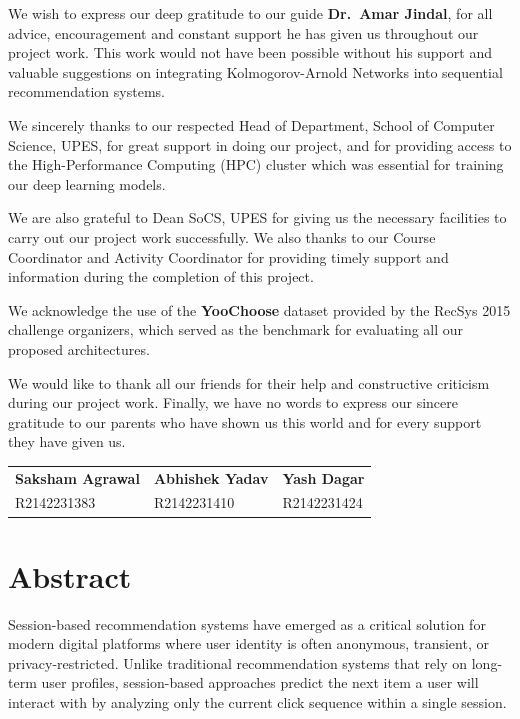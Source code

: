 \documentclass[12pt,a4paper]{report}
\begin{document}
We wish to express our deep gratitude to our guide \textbf{Dr.\ Amar Jindal},
for all advice, encouragement and constant support he has given us throughout our
project work. This work would not have been possible without his support and
valuable suggestions on integrating Kolmogorov-Arnold Networks into sequential
recommendation systems.

We sincerely thanks to our respected Head of Department, School of Computer
Science, UPES, for great support in doing our project, and for providing access
to the High-Performance Computing (HPC) cluster which was essential for training
our deep learning models.

We are also grateful to Dean SoCS, UPES for giving us the necessary facilities
to carry out our project work successfully. We also thanks to our Course
Coordinator and Activity Coordinator for providing timely support and information
during the completion of this project.

We acknowledge the use of the \textbf{YooChoose} dataset provided by the RecSys 2015
challenge organizers, which served as the benchmark for evaluating all our proposed
architectures.

We would like to thank all our friends for their help and constructive criticism
during our project work. Finally, we have no words to express our sincere gratitude
to our parents who have shown us this world and for every support they have given us.

\vspace{1.5cm}

\noindent
\begin{tabular}{p{4cm} p{4cm} p{4cm}}
\textbf{Saksham Agrawal} & \textbf{Abhishek Yadav} & \textbf{Yash Dagar} \\
R2142231383 & R2142231410 & R2142231424 \\
\end{tabular}

\chapter*{Abstract}

Session-based recommendation systems have emerged as a critical solution for
modern digital platforms where user identity is often anonymous, transient, or
privacy-restricted. Unlike traditional recommendation systems that rely on
long-term user profiles, session-based approaches predict the next item a user
will interact with by analyzing only the current click sequence within a single
session.
\end{document}
